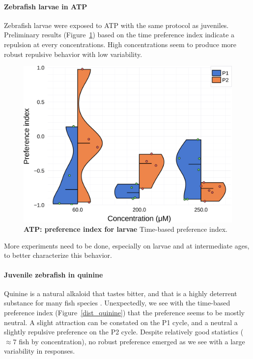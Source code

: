     \paragraph{Zebrafish larvae in ATP} Zebrafish larvae were exposed to ATP with the same protocol as juveniles. Preliminary results (Figure~\ref{dist_atp_lar}) based on the time preference index indicate a repulsion at every concentrations. High concentrations seem to produce more robust repulsive behavior with low variability.

    \begin{figure}[h!]
      \centering
      \includegraphics[width=1\textwidth]{part_2/assets/dist_atp_lar.png}
      \caption{\textbf{ATP: preference index for larvae} Time-based preference index. }
      \label{dist_atp_lar}
    \end{figure}

  More experiments need to be done, especially on larvae and at intermediate ages, to better characterize this behavior.

    \paragraph{Juvenile zebrafish in quinine} Quinine is a natural alkaloid that tastes bitter, and that is a highly deterrent substance for many fish species \cite{kasumyan2003taste}. Unexpectedly, we see with the time-based preference index (Figure~\ref{dist_quinine}) that the preference seems to be mostly neutral. A slight attraction can be constated on the P1 cycle, and a neutral a slightly repulsive preference on the P2 cycle. Despite relatively good statistics ($\approx 7$ fish by concentration), no robust preference emerged as we see with a large variability in responses.

